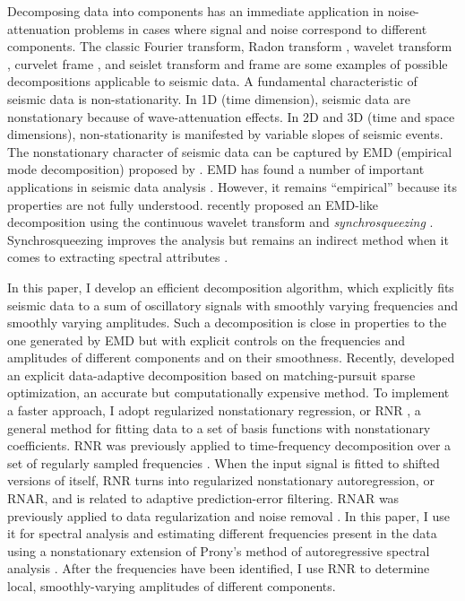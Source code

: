 Decomposing data into components has an immediate application in
noise-attenuation problems in cases where signal and noise correspond
to different components. The classic Fourier transform, Radon
transform \cite[]{gardner}, wavelet transform \cite[]{mallat},
curvelet frame \cite[]{herrmann}, and seislet transform and
frame \cite[]{seislet} are some examples of possible decompositions
applicable to seismic data. A fundamental characteristic of seismic
data is non-stationarity. In 1D (time dimension), seismic data are
nonstationary because of wave-attenuation effects. In 2D and 3D
(time and space dimensions), non-stationarity is manifested by
variable slopes of seismic events.  The nonstationary character of
seismic data can be captured by EMD (empirical mode decomposition)
proposed by \cite{emd}. EMD has found a number of important
applications in seismic data
analysis \cite[]{SEG-1999-19491952,battista,bekara,han}. However, it
remains ``empirical'' because its properties are not fully
understood. \cite{daubechies} recently proposed an EMD-like
decomposition using the continuous wavelet transform and
\emph{synchrosqueezing} \cite[]{squeeze}. Synchro\-squ\-e\-ezing
improves the analysis but remains an indirect method when it comes to
extracting spectral attributes \cite[]{henry}.

In this paper, I develop an efficient decomposition algorithm, which
explicitly fits seismic data to a sum of oscillatory signals with
smoothly varying frequencies and smoothly varying amplitudes. Such a
decomposition is close in properties to the one generated by EMD but
with explicit controls on the frequencies and amplitudes of different
components and on their smoothness. Recently, \cite{hou,hou2}
developed an explicit data-adaptive decomposition based on
matching-pursuit sparse optimization, an accurate but computationally
expensive method. To implement a faster approach, I adopt regularized
nonstationary regression, or RNR \cite[]{lpf}, a general method for
fitting data to a set of basis functions with nonstationary
coefficients. RNR was previously applied to time-frequency
decomposition over a set of regularly sampled
frequencies \cite[]{liu2012}. When the input signal is fitted to
shifted versions of itself, RNR turns into regularized nonstationary
autoregression, or RNAR, and is related to adaptive
prediction-error filtering. RNAR was previously applied to data
regularization \cite[]{yang} and noise removal
\cite[]{guochang,guochang2}. In this paper, I use it for spectral analysis and
estimating different frequencies present in the data using a
nonstationary extension of Prony's method of autoregressive spectral
analysis \cite[]{marple,MSA00-00-05300530}. After the frequencies have
been identified, I use RNR to determine local, smoothly-varying
amplitudes of different components.

